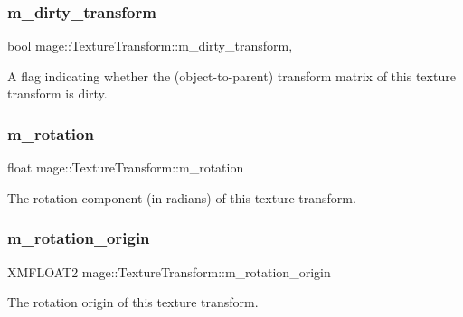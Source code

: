 \subsubsection{\texorpdfstring{m\+\_\+dirty\+\_\+transform}{m\_dirty\_transform}}
{\footnotesize\ttfamily bool mage\+::\+Texture\+Transform\+::m\+\_\+dirty\+\_\+transform\hspace{0.3cm}{\ttfamily [mutable]}, {\ttfamily [private]}}

A flag indicating whether the (object-\/to-\/parent) transform matrix of this texture transform is dirty. \hypertarget{structmage_1_1_texture_transform_a8f8127fa0e832efe5923c2cd8157c2c6}{}\label{structmage_1_1_texture_transform_a8f8127fa0e832efe5923c2cd8157c2c6} 
\subsubsection{\texorpdfstring{m\+\_\+rotation}{m\_rotation}}
{\footnotesize\ttfamily float mage\+::\+Texture\+Transform\+::m\+\_\+rotation\hspace{0.3cm}{\ttfamily [private]}}

The rotation component (in radians) of this texture transform. \hypertarget{structmage_1_1_texture_transform_a6be18aac7ead059bb2ea4b3a464e0272}{}\label{structmage_1_1_texture_transform_a6be18aac7ead059bb2ea4b3a464e0272} 
\subsubsection{\texorpdfstring{m\+\_\+rotation\+\_\+origin}{m\_rotation\_origin}}
{\footnotesize\ttfamily X\+M\+F\+L\+O\+A\+T2 mage\+::\+Texture\+Transform\+::m\+\_\+rotation\+\_\+origin\hspace{0.3cm}{\ttfamily [private]}}

The rotation origin of this texture transform. \hypertarget{structmage_1_1_texture_transform_a57ecf30158fc8ba715c40742f1afa0bd}{}\label{structmage_1_1_texture_transform_a57ecf30158fc8ba715c40742f1afa0bd} 
